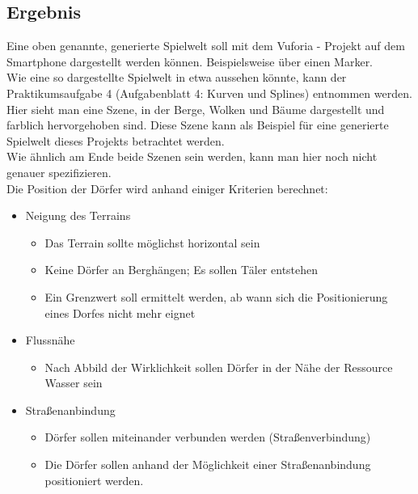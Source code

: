 \documentclass[a4paper]{article}
\begin{document}
	\newpage

	\subsection{Ergebnis}
	Eine oben genannte, generierte Spielwelt soll mit dem Vuforia\textregistered{} - Projekt auf dem Smartphone dargestellt werden können. Beispielsweise über einen Marker. \\
	Wie eine so dargestellte Spielwelt in etwa aussehen könnte, kann der Praktikumsaufgabe 4 (Aufgabenblatt 4: Kurven und Splines) entnommen werden.
	Hier sieht man eine Szene, in der Berge, Wolken und B\"aume dargestellt und farblich hervorgehoben sind. Diese Szene kann als Beispiel f\"ur eine generierte Spielwelt dieses
	Projekts betrachtet werden.\\
	Wie \"ahnlich am Ende beide Szenen sein werden, kann man hier noch nicht genauer spezifizieren. \\

	Die Position der D\"orfer wird anhand einiger Kriterien berechnet:

	\begin{itemize}
		\item Neigung des Terrains
		\begin{itemize}
			\item Das Terrain sollte m\"oglichst horizontal sein
			\item Keine D\"orfer an Bergh\"angen; Es sollen T\"aler entstehen
			\item Ein Grenzwert soll ermittelt werden, ab wann sich die Positionierung eines Dorfes nicht mehr eignet
		\end{itemize}
		\item Flussn\"ahe
		\begin{itemize}
			\item Nach Abbild der Wirklichkeit sollen D\"orfer in der N\"ahe der Ressource \glqq Wasser\grqq{} sein
		\end{itemize}
		\item Straßenanbindung
		\begin{itemize}
			\item D\"orfer sollen miteinander verbunden werden (Straßenverbindung)
			\item Die D\"orfer sollen anhand der M\"oglichkeit einer Straßenanbindung positioniert werden.
		\end{itemize}
	\end{itemize}
		
	\newpage
\end{document}
